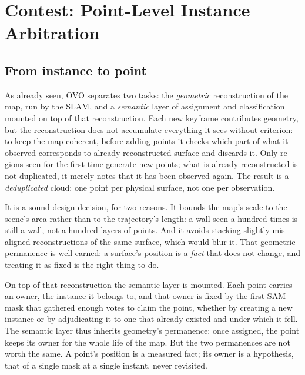 \chapter{Contest: Point-Level Instance Arbitration}
\label{ch:contest}

%

\begin{otherlanguage}{english}

\section{From instance to point}
\label{sec:contest_granularity}

As already seen, OVO separates two tasks: the \emph{geometric} reconstruction of the map, run by the
SLAM, and a \emph{semantic} layer of assignment and classification mounted on top of that
reconstruction. Each new keyframe contributes geometry, but the reconstruction does not accumulate
everything it sees without criterion: to keep the map coherent, before adding points it checks which
part of what it observed corresponds to already-reconstructed surface and discards it. Only regions
seen for the first time generate new points; what is already reconstructed is not duplicated, it
merely notes that it has been observed again. The result is a \emph{deduplicated} cloud: one point
per physical surface, not one per observation.

It is a sound design decision, for two reasons. It bounds the map's scale to the scene's area rather
than to the trajectory's length: a wall seen a hundred times is still a wall, not a hundred layers of
points. And it avoids stacking slightly misaligned reconstructions of the same surface, which would
blur it. That geometric permanence is well earned: a surface's position is a \emph{fact} that does
not change, and treating it as fixed is the right thing to do.

On top of that reconstruction the semantic layer is mounted. Each point carries an owner, the
instance it belongs to, and that owner is fixed by the first SAM mask that gathered enough votes to
claim the point, whether by creating a new instance or by adjudicating it to one that already existed
and under which it fell. The semantic layer thus inherits geometry's permanence: once assigned, the
point keeps its owner for the whole life of the map. But the two permanences are not worth the same.
A point's position is a measured fact; its owner is a hypothesis, that of a single mask at a single
instant, never revisited.


\end{otherlanguage}
